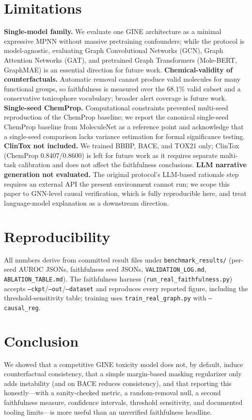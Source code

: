 \documentclass[a4paper,fleqn]{cas-dc}
\newcommand{\ChemClin}{0.8407/0.8600}
\begin{document}
\section{Limitations}
\textbf{Single-model family.} We evaluate one GINE architecture as a minimal expressive MPNN without massive pretraining confounders; while the protocol is model-agnostic, evaluating Graph Convolutional Networks (GCN), Graph Attention Networks (GAT), and pretrained Graph Transformers (Mole-BERT, GraphMAE) is an essential direction for future work. \textbf{Chemical-validity of counterfactuals.} Automatic removal cannot produce valid molecules for many functional groups, so faithfulness is measured over the 68.1\% valid subset and a conservative toxicophore vocabulary; broader alert coverage is future work. \textbf{Single-seed ChemProp.} Computational constraints prevented multi-seed reproduction of the ChemProp baseline; we report the canonical single-seed ChemProp baseline from MoleculeNet as a reference point and acknowledge that a single-seed comparison lacks variance estimation for formal significance testing. \textbf{ClinTox not included.} We trained BBBP, BACE, and TOX21 only; ClinTox (ChemProp \ChemClin) is left for future work as it requires separate multi-task calibration and does not affect the faithfulness conclusions. \textbf{LLM narrative generation not evaluated.} The original protocol's LLM-based rationale step requires an external API the present environment cannot run; we scope this paper to GNN-level causal verification, which is fully reproducible here, and treat language-model explanation as a downstream direction.

\section{Reproducibility}
All numbers derive from committed result files under \texttt{benchmark\_results/} (per-seed AUROC JSONs, faithfulness seed JSONs, \texttt{VALIDATION\_LOG.md}, \texttt{ABLATION\_TABLE.md}). The faithfulness harness (\texttt{run\_real\_faithfulness.py}) accepts \texttt{--ckpt}/\texttt{--out}/\texttt{--dataset} and reproduces every reported figure, including the threshold-sensitivity table; training uses \texttt{train\_real\_graph.py} with \texttt{--causal\_reg}.

\section{Conclusion}
We showed that a competitive GINE toxicity model does not, by default, induce counterfactual consistency, that a simple margin-based masking regularizer only adds instability (and on BACE reduces consistency), and that reporting this honestly---with a sanity-checked metric, a random-removal null, a second faithfulness measure, confidence intervals, threshold sensitivity, and documented tooling limits---is more useful than an unverified faithfulness headline.



\end{document}
